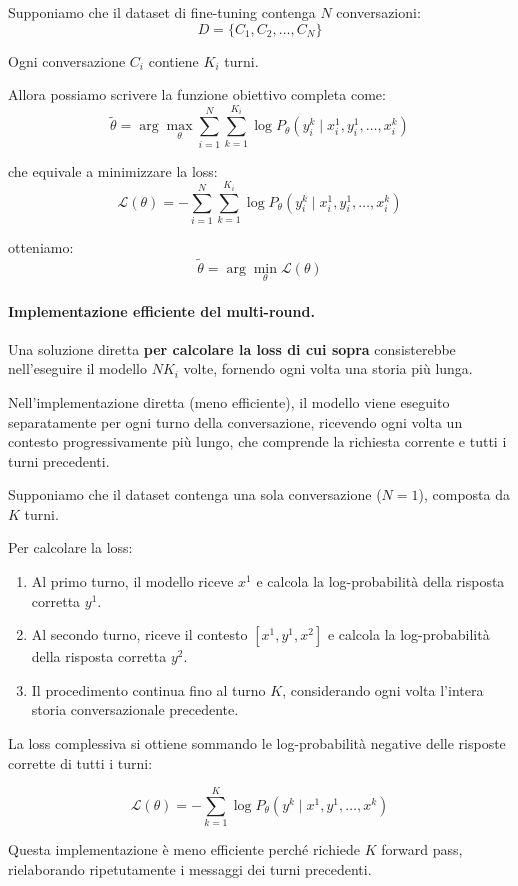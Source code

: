 Supponiamo che il dataset di fine-tuning contenga \(N\) conversazioni:
\[
D=\{C_1,C_2,\ldots,C_N\}
\]

Ogni conversazione \(C_i\) contiene \(K_i\) turni.

Allora possiamo scrivere la funzione obiettivo completa come:
\[
\boxed{
\tilde{\theta}=
\arg\max_\theta
\sum_{i=1}^{N}
\sum_{k=1}^{K_i}
\log P_\theta
\left(
y_i^k\mid
x_i^1,y_i^1,\ldots,x_i^k
\right)
}
\]
 
che equivale a minimizzare la loss:
\[
\mathcal{L}(\theta)=
-\sum_{i=1}^{N}\sum_{k=1}^{K_i}
\log P_\theta(y_i^k\mid x_i^1,y_i^1,\ldots,x_i^k)
\]
\label{loss_bella}

otteniamo:
\[
\boxed{\tilde{\theta}=\arg\min_\theta\mathcal{L}(\theta)}
\]

\paragraph{Implementazione efficiente del multi-round.}
Una soluzione diretta \textbf{per calcolare la loss di cui sopra} consisterebbe nell'eseguire il modello
$N K_i$ volte, fornendo ogni volta una storia più lunga.
\begin{observation}{}
Nell'implementazione diretta (meno efficiente), il modello viene eseguito separatamente per ogni turno della conversazione, ricevendo ogni volta un contesto progressivamente più lungo, che comprende la richiesta corrente e tutti i turni precedenti.

Supponiamo che il dataset contenga una sola conversazione ($N=1$), composta da $K$ turni.

Per calcolare la loss:
\begin{enumerate}
    \item Al primo turno, il modello riceve $x^1$ e calcola la log-probabilità della risposta corretta $y^1$.
    \item Al secondo turno, riceve il contesto $[x^1,y^1,x^2]$ e calcola la log-probabilità della risposta corretta $y^2$.
    \item Il procedimento continua fino al turno $K$, considerando ogni volta l'intera storia conversazionale precedente.
\end{enumerate}

La loss complessiva si ottiene sommando le log-probabilità negative delle risposte corrette di tutti i turni:

$$
\mathcal{L}(\theta)=-\sum_{k=1}^{K}\log P_\theta(y^k\mid x^1,y^1,\ldots,x^k)
$$


Questa implementazione è meno efficiente perché richiede $K$ forward pass, rielaborando ripetutamente i messaggi dei turni precedenti.
\end{observation}


